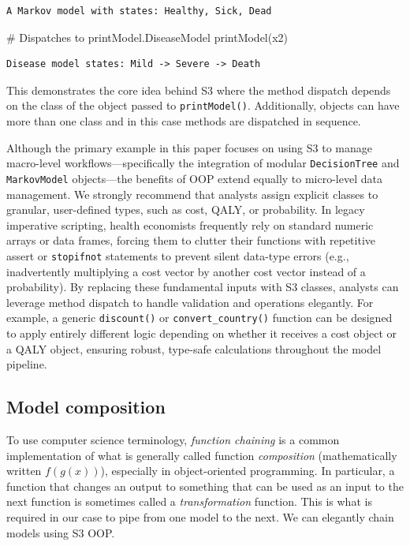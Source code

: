 \documentclass[
]{article}
\newenvironment{Shaded}{\begin{snugshade}}{\end{snugshade}}
\newcommand{\CommentTok}[1]{\textcolor[rgb]{0.37,0.37,0.37}{#1}}
\newcommand{\FunctionTok}[1]{\textcolor[rgb]{0.28,0.35,0.67}{#1}}
\newcommand{\NormalTok}[1]{\textcolor[rgb]{0.00,0.23,0.31}{#1}}
\begin{document}
\begin{verbatim}
A Markov model with states: Healthy, Sick, Dead 
\end{verbatim}

\begin{Shaded}
\begin{Highlighting}[]
\CommentTok{\# Dispatches to printModel.DiseaseModel}
\FunctionTok{printModel}\NormalTok{(x2)}
\end{Highlighting}
\end{Shaded}

\begin{verbatim}
Disease model states: Mild -> Severe -> Death 
\end{verbatim}

This demonstrates the core idea behind S3 where the method dispatch
depends on the class of the object passed to \texttt{printModel()}.
Additionally, objects can have more than one class and in this case
methods are dispatched in sequence.

Although the primary example in this paper focuses on using S3 to manage
macro-level workflows---specifically the integration of modular
\texttt{DecisionTree} and \texttt{MarkovModel} objects---the benefits of
OOP extend equally to micro-level data management. We strongly recommend
that analysts assign explicit classes to granular, user-defined types,
such as cost, QALY, or probability. In legacy imperative scripting,
health economists frequently rely on standard numeric arrays or data
frames, forcing them to clutter their functions with repetitive assert
or \texttt{stopifnot} statements to prevent silent data-type errors
(e.g., inadvertently multiplying a cost vector by another cost vector
instead of a probability). By replacing these fundamental inputs with S3
classes, analysts can leverage method dispatch to handle validation and
operations elegantly. For example, a generic \texttt{discount()} or
\texttt{convert\_country()} function can be designed to apply entirely
different logic depending on whether it receives a cost object or a QALY
object, ensuring robust, type-safe calculations throughout the model
pipeline.

\subsection{Model composition}\label{model-composition}

To use computer science terminology, \emph{function chaining} is a
common implementation of what is generally called function
\emph{composition} (mathematically written \(f(g(x))\)), especially in
object-oriented programming. In particular, a function that changes an
output to something that can be used as an input to the next function is
sometimes called a \emph{transformation} function. This is what is
required in our case to pipe from one model to the next. We can
elegantly chain models using S3 OOP.
\end{document}
